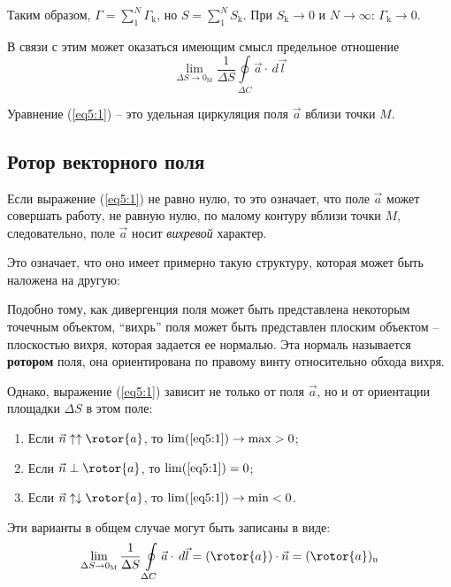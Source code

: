 	Таким образом, \( \Gamma = \sum\limits_1^N \Gamma_\mathrm{k} \), но \( S = \sum\limits_1^N S_\mathrm{k} \). При \( S_\mathrm{k}\to 0 \) и \( N\to\infty \): \( \Gamma_\mathrm{k}\to0 \).
	
	В связи с этим может оказаться имеющим смысл предельное отношение
	\begin{equation}
		\lim_{\Delta S\to 0_\mathrm{M}} \frac{1}{\Delta S} \oint\limits_{\Delta C} \vec{a}\cdot\,d\vec{l} \label{eq5:1}
	\end{equation}
	
	Уравнение (\ref{eq5:1}) -- это удельная циркуляция поля \( \vec{a} \) вблизи точки \( M \).
	
\subsection{Ротор векторного поля}

	Если выражение (\ref{eq5:1}) не равно нулю, то это означает, что поле \( \vec{a} \) может совершать работу, не равную нулю, по малому контуру вблизи точки \( M \), следовательно, поле \( \vec{a} \) носит \textit{вихревой} характер.
	
	Это означает, что оно имеет примерно такую структуру, которая может быть наложена на другую:

	Подобно тому, как дивергенция поля может быть представлена некоторым точечным объектом, “вихрь” поля может быть представлен плоским объектом -- плоскостью вихря, которая задается ее нормалью. Эта нормаль называется \textbf{ротором} поля, она ориентирована по правому винту относительно обхода вихря.
	
	Однако, выражение (\ref{eq5:1}) зависит не только от поля \( \vec{a} \), но и от ориентации площадки \( \Delta S \) в этом поле:
	\begin{enumerate}
	\item Если \( \vec{n} \uparrow\uparrow \rotor{a} \), то \( \lim(\ref{eq5:1}) \to \max > 0 \);
	\item Если \( \vec{n} \perp \rotor{a} \), то \( \lim(\ref{eq5:1}) = 0 \);
	\item Если \( \vec{n} \uparrow\downarrow \rotor{a} \), то \( \lim(\ref{eq5:1}) \to \min < 0 \).
	\end{enumerate}
	
	Эти варианты в общем случае могут быть записаны в виде:
	\begin{equation}
		\lim_{\Delta S\to 0_\mathrm{M}} \frac{1}{\Delta S} \oint\limits_{\Delta C} \vec{a}\cdot\,d\vec{l} = (\rotor{a})\cdot\vec{n} = (\rotor{a})_\mathrm{n} \label{eq5:2}
	\end{equation}
	
